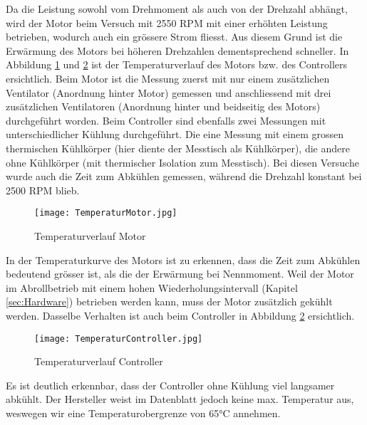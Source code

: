 Da die Leistung sowohl vom Drehmoment als auch von der Drehzahl abhängt, wird  der Motor beim Versuch mit 2550 RPM mit einer erhöhten Leistung betrieben, wodurch auch ein grössere Strom fliesst. Aus diesem Grund ist die Erwärmung des Motors bei höheren Drehzahlen dementsprechend schneller. In Abbildung \ref{fig:TemperaturMotor} und \ref{fig:TemperaturController} ist der Temperaturverlauf des Motors bzw. des Controllers ersichtlich. Beim Motor ist die Messung zuerst mit nur einem zusätzlichen Ventilator (Anordnung hinter Motor) gemessen und anschliessend mit drei zusätzlichen Ventilatoren (Anordnung hinter und beidseitig des Motors) durchgeführt worden. Beim Controller sind ebenfalls zwei Messungen mit unterschiedlicher Kühlung durchgeführt. Die eine Messung mit einem grossen thermischen Kühlkörper (hier diente der Messtisch als Kühlkörper), die andere ohne Kühlkörper (mit thermischer Isolation zum Messtisch). Bei diesen Versuche wurde auch die Zeit zum Abkühlen gemessen, während die Drehzahl konstant bei 2500 RPM blieb.


\begin{figure}[H]
	\centering
	\texttt{[image: TemperaturMotor.jpg]}
	\caption{Temperaturverlauf Motor}\label{fig:TemperaturMotor}
\end{figure}

In der Temperaturkurve des Motors ist zu erkennen, dass die Zeit zum Abkühlen bedeutend grösser ist, als die der Erwärmung bei Nennmoment. Weil der Motor im Abrollbetrieb mit einem hohen Wiederholungsintervall (Kapitel \ref{sec:Hardware}) betrieben werden kann, muss der Motor zusätzlich gekühlt werden. Dasselbe Verhalten ist auch beim Controller in Abbildung \ref{fig:TemperaturController} ersichtlich.

\begin{figure}[H]
	\centering
	\texttt{[image: TemperaturController.jpg]}
	\caption{Temperaturverlauf Controller}\label{fig:TemperaturController}
\end{figure}

Es ist deutlich erkennbar, dass der Controller ohne Kühlung viel langsamer abkühlt. Der Hersteller weist im Datenblatt\cite{ControllerUserGuide} jedoch keine max. Temperatur aus, weswegen wir eine Temperaturobergrenze von 65°C annehmen.